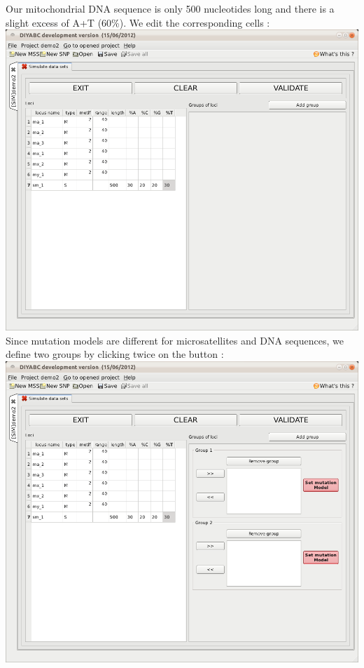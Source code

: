Our mitochondrial DNA sequence is only 500 nucleotides long and there is a slight excess of A+T (60\%). We edit the corresponding cells : \\

\includegraphics[scale=0.33]{gui_pictures/Capture-DIYABC-74.png} \\

Since mutation models are different for microsatellites and DNA sequences, we define two groups by clicking twice on the  button :\\

\includegraphics[scale=0.33]{gui_pictures/Capture-DIYABC-75.png} \\

